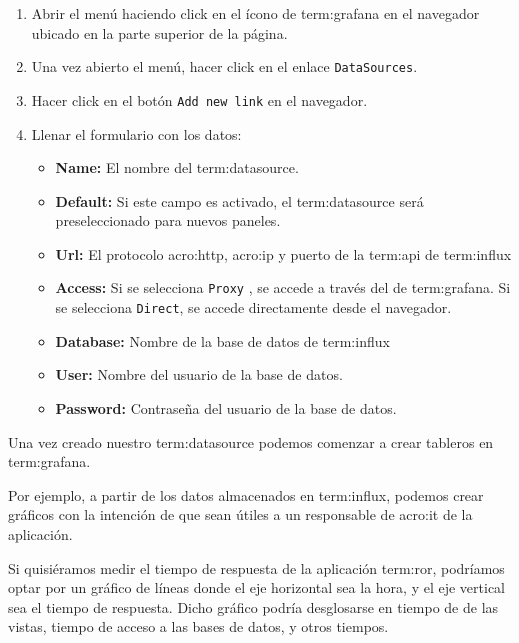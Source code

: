 \begin{enumerate}
  \item Abrir el menú haciendo click en el ícono de \gls{term:grafana} en el
  navegador ubicado en la parte superior de la página.

  \item Una vez abierto el menú, hacer click en el enlace \texttt{DataSources}.
  \item Hacer click en el botón \texttt{Add new link} en el navegador.
  \item Llenar el formulario con los datos:
    \begin{itemize}
      \item \textbf{Name:}
      El nombre del \gls{term:datasource}.

      \item \textbf{Default:}
      Si este campo es activado, el \gls{term:datasource} será preseleccionado
      para nuevos paneles.

      \item \textbf{Url:}
      El protocolo \gls{acro:http}, \gls{acro:ip} y puerto de la \gls{term:api}
      de \gls{term:influx}

      \item \textbf{Access:}
      Si se selecciona \texttt{Proxy} , se accede a través del  de
      \gls{term:grafana}.
      Si se selecciona \texttt{Direct}, se accede directamente desde el
      navegador.

      \item \textbf{Database:}
      Nombre de la base de datos de \gls{term:influx}

      \item \textbf{User:}
      Nombre del usuario de la base de datos.

      \item \textbf{Password:}
      Contraseña del usuario de la base de datos.

    \end{itemize}
\end{enumerate}

Una vez creado nuestro \gls{term:datasource} podemos comenzar a crear tableros
en \gls{term:grafana}.

Por ejemplo, a partir de los datos almacenados en \gls{term:influx}, podemos
crear gráficos con la intención de que sean útiles a un responsable de
\gls{acro:it} de la aplicación.

Si quisiéramos medir el tiempo de respuesta de la aplicación \gls{term:ror},
podríamos optar por un gráfico de líneas donde el eje horizontal sea la hora, y
el eje vertical sea el tiempo de respuesta. Dicho gráfico podría desglosarse en
tiempo de  de las vistas, tiempo de acceso a las bases de
datos, y otros tiempos.


